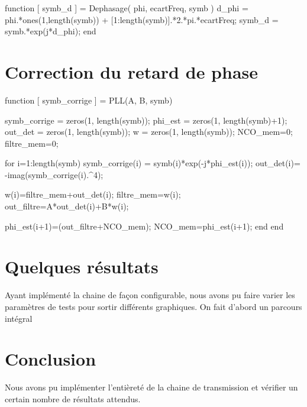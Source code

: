 \documentclass[a4paper,11pt]{article}
\begin{document}
\begin{lstun}
	function [ symb_d ] = Dephasage( phi, ecartFreq, symb )
	d_phi = phi.*ones(1,length(symb)) + [1:length(symb)].*2.*pi.*ecartFreq;
	symb_d = symb.*exp(j*d_phi);
	end
\end{lstun}

\section{Correction du retard de phase}

\begin{lstun}
	function [ symb_corrige ] = PLL(A, B, symb)
	
	symb_corrige = zeros(1, length(symb));
	phi_est = zeros(1, length(symb)+1);
	out_det = zeros(1, length(symb));
	w = zeros(1, length(symb));
	NCO_mem=0;      %
	filtre_mem=0;   %
	
	for i=1:length(symb)
	symb_corrige(i) = symb(i)*exp(-j*phi_est(i));
	out_det(i)= -imag(symb_corrige(i).^4);
	
	w(i)=filtre_mem+out_det(i); %
	filtre_mem=w(i);            
	out_filtre=A*out_det(i)+B*w(i);   %
	
	phi_est(i+1)=(out_filtre+NCO_mem); %
	NCO_mem=phi_est(i+1);
	end
	end	
\end{lstun}

\section{Quelques résultats}
Ayant implémenté la chaine de façon configurable, nous avons pu faire varier les paramètres de tests pour sortir différents graphiques. 
On fait d'abord un parcours intégral 

\section{Conclusion}
Nous avons pu implémenter l'entièreté de la chaine de transmission et vérifier un certain nombre de résultats attendus. 

\newpage
\end{document}
